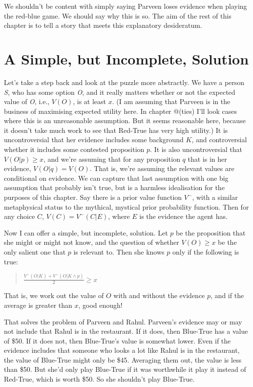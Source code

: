 \documentclass[11pt,]{book}
\begin{document}
We shouldn't be content with simply saying Parveen loses evidence when playing the red-blue game. We should say why this is so. The aim of the rest of this chapter is to tell a story that meets this explanatory desideratum.

\hypertarget{simplesolution}{%
\section{A Simple, but Incomplete, Solution}\label{simplesolution}}

Let's take a step back and look at the puzzle more abstractly. We have a person \emph{S}, who has some option \emph{O}, and it really matters whether or not the expected value of \emph{O}, i.e., \(V(O)\), is at least \(x\). (I am assuming that Parveen is in the business of maximising expected utility here. In chapter @(ties) I'll look cases where this is an unreasonable assumption. But it seems reasonable here, because it doesn't take much work to see that Red-True has very high utility.) It is uncontroversial that her evidence includes some background \(K\), and controversial whether it includes some contested proposition \(p\). It is also uncontroversial that \(V(O | p) \geq x\), and we're assuming that for any proposition \(q\) that is in her evidence, \(V(O | q) = V(O)\). That is, we're assuming the relevant values are conditional on evidence. We can capture that last assumption with one big assumption that probably isn't true, but is a harmless idealisation for the purposes of this chapter. Say there is a prior value function \(V^-\), with a similar metaphysical status to the mythical, mystical prior probability function. Then for any choice \(C\), \(V(C) = V^-(C | E)\), where \(E\) is the evidence the agent has.

Now I can offer a simple, but incomplete, solution. Let \(p\) be the proposition that she might or might not know, and the question of whether \(V(O) \geq x\) be the only salient one that \(p\) is relevant to. Then she knows \(p\) only if the following is true:

\begin{quote}
\(\frac{V^-(O | K) + V^-(O | K \wedge p)}{2} \geq x\)
\end{quote}

That is, we work out the value of \(O\) with and without the evidence \(p\), and if the average is greater than \(x\), good enough!

That solves the problem of Parveen and Rahul. Parveen's evidence may or may not include that Rahul is in the restaurant. If it does, then Blue-True has a value of \$50. If it does not, then Blue-True's value is somewhat lower. Even if the evidence includes that someone who looks a lot like Rahul is in the restaurant, the value of Blue-True might only be \$45. Averaging them out, the value is less than \$50. But she'd only play Blue-True if it was worthwhile it play it instead of Red-True, which is worth \$50. So she shouldn't play Blue-True.
\end{document}
